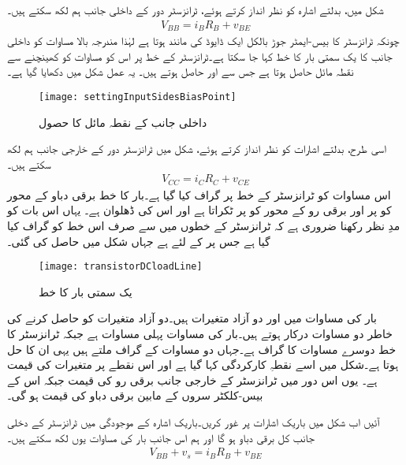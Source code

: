 شکل   میں، بدلتے اشارہ   کو نظر انداز کرتے ہوئے، ٹرانزسٹر دور کے داخلی جانب ہم لکھ سکتے ہیں۔
\begin{align}
V_{BB}=i_B R_B + v_{BE}
\end{align}
چونکہ ٹرانزسٹر کا بیس-ایمٹر  جوڑ بالکل ایک ڈایوڈ کی مانند ہوتا ہے لہٰذا مندرجہ بالا مساوات کو داخلی جانب کا یک سمتی بار کا خط  کہا جا سکتا ہے۔ٹرانزسٹر کے  خط پر اس کو مساوات کو کھینچنے سے نقطہ مائل حاصل ہوتا ہے جس سے  اور  حاصل ہوتے ہیں۔ یہ عمل شکل   میں دکھایا گیا ہے۔
\begin{figure}
\centering
\texttt{[image: settingInputSidesBiasPoint]}
\caption{داخلی جانب کے نقطہ مائل کا حصول}
\label{شکل_داخلی_جانب_نکتہ_مائل_کا_حصول}
\end{figure}
اسی طرح، بدلتے اشارات کو نظر انداز کرتے ہوئے، شکل   میں ٹرانزسٹر دور کے خارجی جانب ہم لکھ سکتے ہیں۔
\begin{align} \label{مساوات_ٹرانزسٹر_بار}
V_{CC}=i_C R_C + v_{CE}
\end{align}
اس مساوات کو ٹرانزسٹر کے   خط پر گراف کیا گیا ہے۔بار کا خط برقی دباو کے محور کو  پر اور برقی رو کے محور کو
پر ٹکراتا ہے اور اس کی ڈھلوان  ہے۔ یہاں اس بات کو مدِ نظر رکھنا ضروری ہے کہ ٹرانزسٹر کے   خطوں میں سے صرف اس خط کو گراف کیا گیا ہے جس پر  کے لئے ہے جہاں  شکل   میں حاصل کی گئی۔
\begin{figure}
\centering
\texttt{[image: transistorDCloadLine]}
\caption{یک سمتی بار کا خط}
\label{شکل_ٹرانزسٹر_کے_یک_سمتی_بار_کا_خط}
\end{figure}
بار کی مساوات میں  اور  دو آزاد متغیرات ہیں۔دو آزاد متغیرات کو حاصل کرنے کی خاطر دو مساوات درکار ہوتے ہیں۔بار کی مساوات پہلی مساوات ہے جبکہ ٹرانزسٹر کا  خط دوسرے مساوات کا گراف ہے۔جہاں دو مساوات کے گراف ملتے ہیں یہی ان کا حل ہوتا ہے۔شکل  میں اسے نقطہِ کارکردگی    کہا گیا ہے اور اس نقطے پر متغیرات کی قیمت    ہے۔ یوں اس دور میں ٹرانزسٹر کے خارجی جانب برقی رو کی قیمت جبکہ اس کے بیس-کلکٹر سروں کے مابین برقی دباو کی قیمت ہو گی۔


آئیں اب شکل   میں باریک اشارات پر غور کریں۔باریک اشارہ  کے موجودگی میں ٹرانزسٹر کے دخلی جانب کل برقی دباو  ہو گا اور ہم اس جانب بار کی مساوات یوں لکھ سکتے ہیں۔
\begin{align}
V_{BB}+v_s = i_B R_B +v_{BE}
\end{align}


